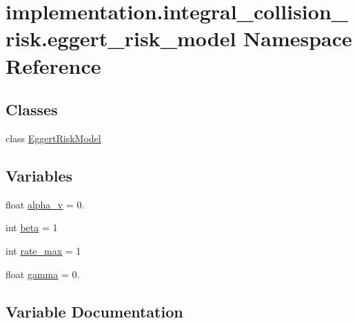 \hypertarget{namespaceimplementation_1_1integral__collision__risk_1_1eggert__risk__model}{}\section{implementation.\+integral\+\_\+collision\+\_\+risk.\+eggert\+\_\+risk\+\_\+model Namespace Reference}
\label{namespaceimplementation_1_1integral__collision__risk_1_1eggert__risk__model}
\subsection*{Classes}
\begin{DoxyCompactItemize}
\item 
class \hyperlink{classimplementation_1_1integral__collision__risk_1_1eggert__risk__model_1_1_eggert_risk_model}{Eggert\+Risk\+Model}
\end{DoxyCompactItemize}
\subsection*{Variables}
\begin{DoxyCompactItemize}
\item 
float \hyperlink{namespaceimplementation_1_1integral__collision__risk_1_1eggert__risk__model_a6c5e75083d2264902ecb9f66ad26e555}{alpha\+\_\+v} = 0.
\item 
int \hyperlink{namespaceimplementation_1_1integral__collision__risk_1_1eggert__risk__model_aecf773943980265cdc886ef4ba480741}{beta} = 1
\item 
int \hyperlink{namespaceimplementation_1_1integral__collision__risk_1_1eggert__risk__model_abac4b9951c1e8ce95f0c7fe6125e6cfc}{rate\+\_\+max} = 1
\item 
float \hyperlink{namespaceimplementation_1_1integral__collision__risk_1_1eggert__risk__model_a0e6d3c0e06b187a81a0f083f0de07221}{gamma} = 0.
\end{DoxyCompactItemize}


\subsection{Variable Documentation}
\mbox{\label{namespaceimplementation_1_1integral__collision__risk_1_1eggert__risk__model_a6c5e75083d2264902ecb9f66ad26e555}} 
